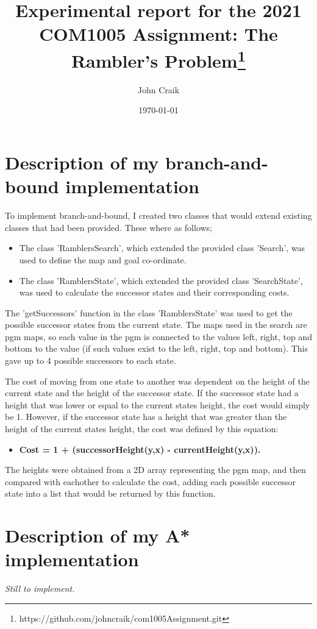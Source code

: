 \documentclass[11pt,oneside]{article}
\title{Experimental report for the 2021 COM1005 Assignment: The Rambler's Problem\footnote{https://github.com/johncraik/com1005Assignment.git}}
\author{John Craik}
\date{\today}
\begin{document}
\maketitle

\section{Description of my branch-and-bound implementation}
To implement branch-and-bound, I created two classes that would extend existing classes that had been provided. These where as follows;
\begin{itemize}
    \item The class 'RamblersSearch', which extended the provided class 'Search', was used to define the map and goal co-ordinate.
    \item The class 'RamblersState', which extended the provided class 'SearchState', was used to calculate the successor states and their corresponding costs.
\end{itemize}
The 'getSuccessors' function in the class 'RamblersState' was used to get the possible successor states from the current state. The maps used in the search are pgm maps, so each value in the pgm is connected to the values left, right, top and bottom to the value (if such values exist to the left, right, top and bottom). This gave up to 4 possible successors to each state.

The cost of moving from one state to another was dependent on the height of the current state and the height of the successor state. If the successor state had a height that was lower or equal to the current states height, the cost would simply be 1. However, if the successor state has a height that was greater than the height of the  current states height, the cost was defined by this equation:
\begin{itemize}
    \item \textbf{Cost = 1 + (successorHeight(y,x) - currentHeight(y,x)).}
\end{itemize}
The heights were obtained from a 2D array representing the pgm map, and then compared with eachother to calculate the cost, adding each possible successor state into a list that would be returned by this function.

\section{Description of my A* implementation}
\textit{Still to implement.}
\end{document}
